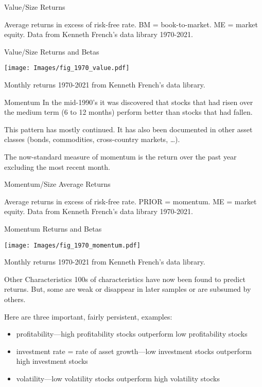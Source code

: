 \documentclass[xcolor=dvipsnames,10pt]{beamer}
\begin{document}
\begin{frame}{Value/Size Returns}
\begin{center}

\end{center}
Average returns in excess of risk-free rate.  BM = book-to-market.  ME = market equity.  Data from Kenneth French's data library 1970-2021.
\end{frame}

\begin{frame}{Value/Size Returns and Betas}
    \begin{center}
        \texttt{[image: Images/fig\_1970\_value.pdf]}
    \end{center}
     Monthly returns 1970-2021 from Kenneth French's data library.
\end{frame}

\begin{frame}{Momentum}
In the mid-1990's it was discovered that stocks that had risen over the medium term (6 to 12 months) perform better than stocks that had fallen.

This pattern has mostly continued.  It has also been documented in other asset classes (bonds, commodities, cross-country markets, \ldots).  

The now-standard measure of momentum is the return over the past year excluding the most recent month.
\end{frame}

\begin{frame}{Momentum/Size Average Returns}
      \begin{center}
        
    \end{center}
    Average returns in excess of risk-free rate. PRIOR = momentum.  ME = market equity.  Data from Kenneth French's data library 1970-2021.
\end{frame}

\begin{frame}{Momentum Returns and Betas}
  \begin{center}
        \texttt{[image: Images/fig\_1970\_momentum.pdf]}
    \end{center}
     Monthly returns 1970-2021 from Kenneth French's data library.
\end{frame}     
     
\begin{frame}{Other Characteristics}
   100s of characteristics have now been found to predict returns.  But, some are weak or disappear in later samples or are subsumed by others.  
   
    Here are three important, fairly persistent, examples:
   \begin{itemize}
       \item profitability---high profitability stocks outperform low profitability stocks
   \item investment rate = rate of asset growth---low investment stocks outperform high investment stocks
   \item volatility---low volatility stocks outperform high volatility stocks
   \end{itemize} 
\end{frame}
\end{document}
